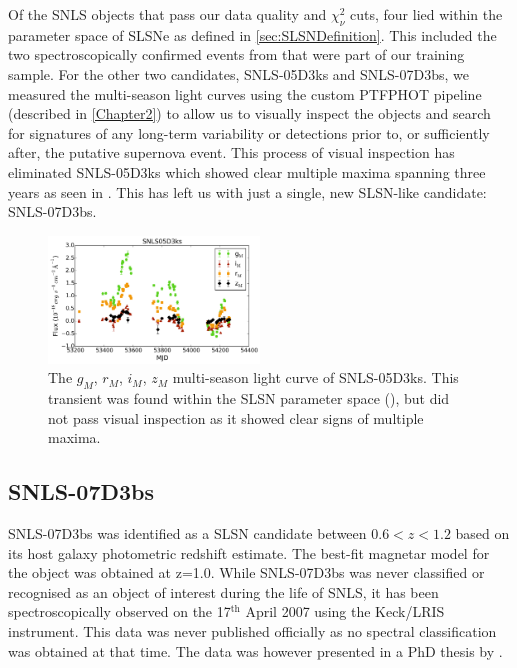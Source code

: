 Of the SNLS objects that pass our data quality and $\chi^2_{\nu}$ cuts, four lied within the parameter space of SLSNe as defined in \ref{sec:SLSNDefinition}. This included the two spectroscopically confirmed events from \citet{Howell2013} that were part of our training sample. For the other two candidates, SNLS-05D3ks and SNLS-07D3bs, we measured the multi-season light curves using the custom \textsc{PTFPHOT} pipeline (described in \cref{Chapter2}) to allow us to visually inspect the objects and search for signatures of any long-term variability or detections prior to, or sufficiently after, the putative supernova event. This process of visual inspection has eliminated SNLS-05D3ks which showed clear multiple maxima spanning three years as seen in . This has left us with just a single, new SLSN-like candidate: SNLS-07D3bs.

\begin{figure}
\centering
\includegraphics[width=0.5\textwidth]{Figures/Chapter3/SNLS05D3ks}
\caption{The $g_M$, $r_M$, $i_M$, $z_M$ multi-season light curve of SNLS-05D3ks. This transient was found within the SLSN parameter space (), but did not pass visual inspection as it showed clear signs of multiple maxima.}
\label{fig:05D3ks}
\end{figure}

\subsection{SNLS-07D3bs}
\label{sec:07D3bs}
SNLS-07D3bs was identified as a SLSN candidate between $0.6<z<1.2$ based on its host galaxy photometric redshift estimate. The best-fit magnetar model for the object was obtained at z=1.0. While SNLS-07D3bs was never classified or recognised as an object of interest during the life of SNLS, it has been spectroscopically observed on the 17$^{\mathrm{th}}$ April 2007 using the Keck/LRIS instrument. This data was never published officially as no spectral classification was obtained at that time. The data was however presented in a PhD thesis by \citet{2013PhDT.......150F}.

